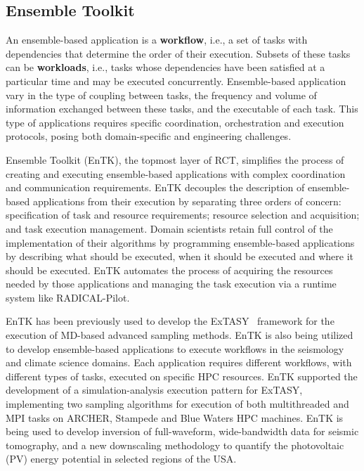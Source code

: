 \subsection{Ensemble Toolkit}

An ensemble-based application is a \textbf{workflow}, i.e., a set of tasks
with dependencies that determine the order of their execution. Subsets of
these tasks can be \textbf{workloads}, i.e., tasks whose dependencies have
been satisfied at a particular time and may be executed concurrently.
Ensemble-based application vary in the type of coupling between tasks, the
frequency and volume of information exchanged 
between these tasks, and the executable of
each task. This type of applications requires specific coordination,
orchestration and execution protocols, posing both domain-specific and
engineering challenges.

Ensemble Toolkit (EnTK), the topmost layer of RCT, simplifies the process of
creating and executing ensemble-based applications with complex coordination
and communication requirements. EnTK decouples the description of
ensemble-based applications from their execution by separating three orders
of concern: specification of task and resource requirements; resource
selection and acquisition; and task execution management. Domain scientists 
retain full control of the implementation of their algorithms by programming
ensemble-based applications by describing what should be executed, when it
should be executed and where it should be executed. EnTK automates the process 
of acquiring the resources needed by those applications and managing the task 
execution via a runtime system like RADICAL-Pilot.


EnTK has been previously used to develop the 
ExTASY~\cite{balasubramanian2016extasy} framework for the execution of MD-based 
advanced sampling methods. EnTK is also being utilized to develop ensemble-based
applications to execute workflows in the seismology and climate science domains.
Each application requires different workflows, with different types of tasks, 
executed on specific HPC resources. EnTK supported the development of a 
simulation-analysis execution pattern for ExTASY, implementing two sampling 
algorithms for execution of both multithreaded and MPI tasks on ARCHER, 
Stampede and Blue Waters HPC machines. EnTK is being used to develop inversion 
of full-waveform, wide-bandwidth data for seismic tomography, and a 
new downscaling methodology to quantify the photovoltaic (PV) energy potential 
in selected regions of the USA\@.

